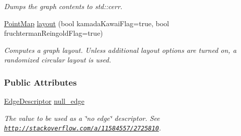 \begin{DoxyCompactItemize}
\begin{DoxyCompactList}\small\item\em Dumps the graph contents to std\+::cerr. \end{DoxyCompactList}\item 
\hyperlink{structStateGraph_a21b31bbe893554826be5aee67ef0cab9}{Point\+Map} \hyperlink{structStateGraph_a961df42b74bf4930796251ab8fcdbb4e}{layout} (bool kamada\+Kawai\+Flag=true, bool fruchterman\+Reingold\+Flag=true)
\begin{DoxyCompactList}\small\item\em Computes a graph layout. Unless additional layout options are turned on, a randomized circular layout is used. \end{DoxyCompactList}\end{DoxyCompactItemize}
\subsubsection*{Public Attributes}
\begin{DoxyCompactItemize}
\item 
\hyperlink{structStateGraph_a419a555605bf486301b84dd6055d81f2}{Edge\+Descriptor} \hyperlink{structStateGraph_a170eda4f7c740836ea4192000903482c}{null\+\_\+edge}\hypertarget{structStateGraph_a170eda4f7c740836ea4192000903482c}{}\label{structStateGraph_a170eda4f7c740836ea4192000903482c}

\begin{DoxyCompactList}\small\item\em The value to be used as a \char`\"{}no edge\char`\"{} descriptor. See \href{http://stackoverflow.com/a/11584557/2725810}{\tt http\+://stackoverflow.\+com/a/11584557/2725810}. \end{DoxyCompactList}\end{DoxyCompactItemize}
